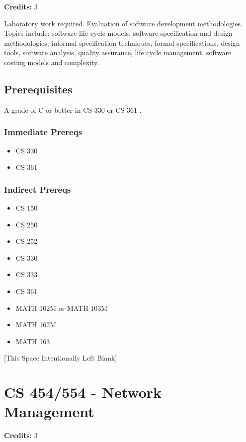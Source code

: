 \documentclass[]{article}
\providecommand{\tightlist}{%
  \setlength{\itemsep}{0pt}\setlength{\parskip}{0pt}}
\newcommand{\pagebreakhere}{
\vspace*{\fill}
\begin{center}
[This Space Intentionally Left Blank]
\end{center}
\vspace*{\fill}
\newpage
}
\begin{document}
\textbf{Credits:} 3

Laboratory work required. Evaluation of software development
methodologies. Topics include: software life cycle models, software
specification and design methodologies, informal specification
techniques, formal specifications, design tools, software analysis,
quality assurance, life cycle management, software costing models and
complexity.

\subsection{Prerequisites}\label{prerequisites-34}

A grade of C or better in CS 330 or CS 361 .

\subsubsection{Immediate Prereqs}\label{immediate-prereqs-26}

\begin{itemize}
\tightlist
\item
  CS 330
\item
  CS 361
\end{itemize}

\subsubsection{Indirect Prereqs}\label{indirect-prereqs-26}

\begin{itemize}
\tightlist
\item
  CS 150
\item
  CS 250
\item
  CS 252
\item
  CS 330
\item
  CS 333
\item
  CS 361
\item
  MATH 102M or MATH 103M
\item
  MATH 162M
\item
  MATH 163
\end{itemize}

\pagebreakhere
\section{CS 454/554 - Network
Management}\label{cs-454554---network-management}

\textbf{Credits:} 3
\end{document}
